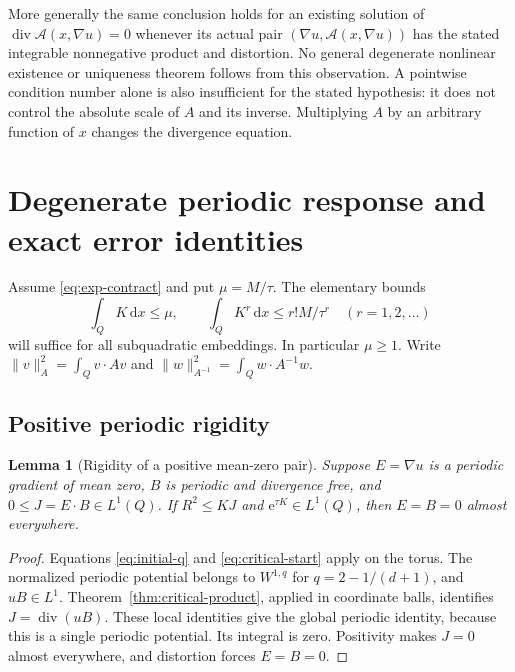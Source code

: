 \documentclass[11pt,a4paper]{article}
\numberwithin{equation}{section}
\newtheorem{lemma}[theorem]{Lemma}
\theoremstyle{definition}
\theoremstyle{remark}\newtheorem{remark}[theorem]{Remark}
\DeclareMathOperator{\diver}{div}
\newcommand{\ee}{\mathrm e}
\newcommand{\dd}{\,\mathrm dx}
\newcommand{\norm}[1]{\lVert #1\rVert}
\begin{document}
More generally the same conclusion holds for an existing solution of
\(\diver\mathcal A(x,\nabla u)=0\) whenever its actual pair
\((\nabla u,\mathcal A(x,\nabla u))\) has the stated integrable
nonnegative product and distortion. No general degenerate nonlinear
existence or uniqueness theorem follows from this observation.
A pointwise condition number alone is also insufficient for the
stated hypothesis: it does not control the absolute scale of \(A\)
and its inverse. Multiplying \(A\) by an arbitrary function of \(x\)
changes the divergence equation.



\section{Degenerate periodic response and exact error identities}\label{sec:response}

Assume \eqref{eq:exp-contract} and put \(\mu=M/\tau\).
The elementary bounds
\begin{equation}\label{eq:K-moments}
 \int_QK\dd\leq\mu,\qquad
 \int_QK^r\dd\leq r!M/\tau^r\quad(r=1,2,\ldots)
\end{equation}
will suffice for all subquadratic embeddings. In particular \(\mu\geq1\).
Write
\(\norm v_A^2=\int_Qv\cdot Av\) and
\(\norm w_{A^{-1}}^2=\int_Qw\cdot A^{-1}w\).

\subsection{Positive periodic rigidity}

\begin{lemma}[Rigidity of a positive mean-zero pair]\label{lem:rigidity}
Suppose \(E=\nabla u\) is a periodic gradient of mean zero, \(B\) is
periodic and divergence free, and \(0\leq J=E\cdot B\in L^1(Q)\).
If \(R^2\leq KJ\) and \(\ee^{\tau K}\in L^1(Q)\), then \(E=B=0\)
almost everywhere.
\end{lemma}

\begin{proof}
Equations \eqref{eq:initial-q} and \eqref{eq:critical-start} apply
on the torus. The normalized periodic potential belongs to \(W^{1,q}\)
for \(q=2-1/(d+1)\), and \(uB\in L^1\).
Theorem~\ref{thm:critical-product}, applied in coordinate balls,
identifies \(J=\diver(uB)\). These local identities give the global
periodic identity, because this is a single periodic potential.
Its integral is zero. Positivity makes \(J=0\) almost everywhere,
and distortion forces \(E=B=0\).
\end{proof}
\end{document}
